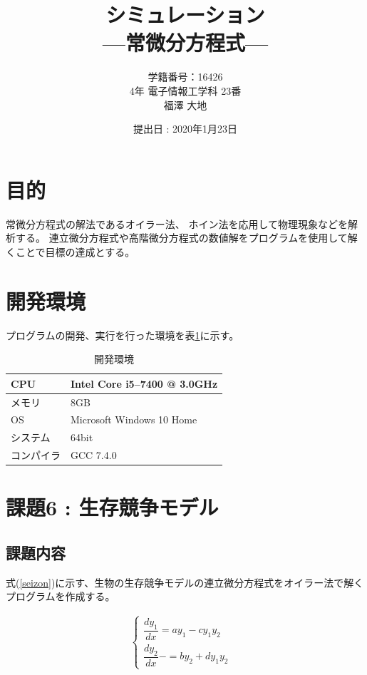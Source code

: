 \documentclass[a4j,titlepage]{jsarticle}
\begin{document}
\begin{titlepage}
  \title{\huge{シミュレーション} \\ \LARGE{---常微分方程式---}}
	\author{学籍番号：16426 \\ 4年 電子情報工学科 23番 \\ 福澤 大地}
	\date{提出日 : 2020年1月23日}
  \maketitle
\end{titlepage}


\section{目的}
常微分方程式の解法であるオイラー法、 ホイン法を応用して物理現象などを解析する。
連立微分方程式や高階微分方程式の数値解をプログラムを使用して解くことで目標の達成とする。


\section{開発環境}
プログラムの開発、実行を行った環境を表\ref{tb:kan}に示す。

\begin{table}[H]
  \centering
  \caption{開発環境}
  \label{tb:kan}

  \begin{tabular}{|l|l|}
    \hline
    CPU & Intel Core i5--7400 @ 3.0GHz \\ \hline
    メモリ & 8GB \\ \hline
    OS & Microsoft Windows 10 Home \\ \hline
    システム & 64bit \\ \hline
    コンパイラ & GCC 7.4.0 \\ \hline
  \end{tabular}
\end{table}


\section{課題6 : 生存競争モデル}
\subsection{課題内容}
式(\ref{seizon})に示す、生物の生存競争モデルの連立微分方程式をオイラー法で解くプログラムを作成する。

\begin{eqnarray}
  \begin{cases}
  \dfrac{dy_{1}}{dx} = ay_{1} - cy_{1} y_{2} & \\
  \dfrac{dy_{2}}{dx} -= by_2 + dy_{1} y_{2} &
  \label{seizon}
  \end{cases}
  \label{223759_6Jan19}
\end{eqnarray}
\end{document}
